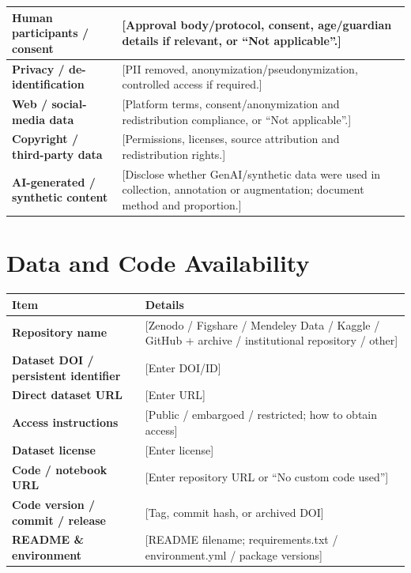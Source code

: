 \documentclass[11pt,a4paper]{article}
\begin{document}
\vspace{0.5em}

\noindent
\begin{tabularx}{\textwidth}{|p{4.5cm}|X|}
\hline
\textbf{Human participants / consent} & [Approval body/protocol, consent, age/guardian details if relevant, or “Not applicable”.] \\
\hline
\textbf{Privacy / de-identification} & [PII removed, anonymization/pseudonymization, controlled access if required.] \\
\hline
\textbf{Web / social-media data} & [Platform terms, consent/anonymization and redistribution compliance, or “Not applicable”.] \\
\hline
\textbf{Copyright / third-party data} & [Permissions, licenses, source attribution and redistribution rights.] \\
\hline
\textbf{AI-generated / synthetic content} & [Disclose whether GenAI/synthetic data were used in collection, annotation or augmentation; document method and proportion.] \\
\hline
\end{tabularx}

\vspace{1.5em}

\section{Data and Code Availability}
\noindent
\begin{tabularx}{\textwidth}{|p{5.5cm}|X|}
\hline
\textbf{Item} & \textbf{Details} \\
\hline
\textbf{Repository name} & [Zenodo / Figshare / Mendeley Data / Kaggle / GitHub + archive / institutional repository / other] \\
\hline
\textbf{Dataset DOI / persistent identifier} & [Enter DOI/ID] \\
\hline
\textbf{Direct dataset URL} & [Enter URL] \\
\hline
\textbf{Access instructions} & [Public / embargoed / restricted; how to obtain access] \\
\hline
\textbf{Dataset license} & [Enter license] \\
\hline
\textbf{Code / notebook URL} & [Enter repository URL or “No custom code used”] \\
\hline
\textbf{Code version / commit / release} & [Tag, commit hash, or archived DOI] \\
\hline
\textbf{README \& environment} & [README filename; requirements.txt / environment.yml / package versions] \\
\hline
\end{tabularx}
\end{document}
